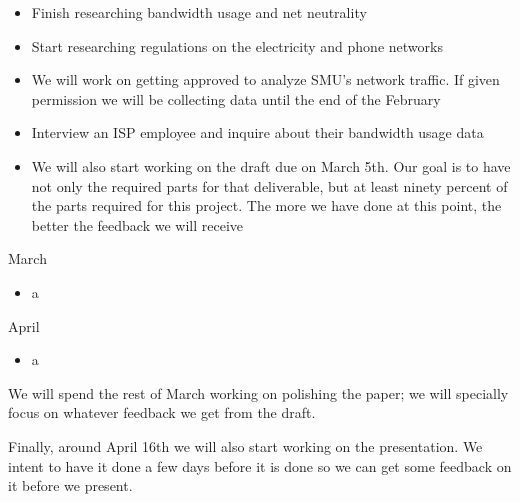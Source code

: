\documentclass{sigcomm-alternate}
\begin{document}
\begin{itemize}
	
	\item Finish researching bandwidth usage and net neutrality
	
	\item Start researching regulations on the electricity and phone networks
	
	\item We will work on getting approved to analyze SMU's network traffic. If given permission we will be collecting data until the end of the February
		
	\item Interview an ISP employee and inquire about their bandwidth usage data
		
	\item We will also start working on the draft due on March 5th. Our goal is to have not only the required parts for that deliverable, but at least ninety percent of the parts required for this project. The more we have done at this point, the better the feedback we will receive%
		
\end{itemize}



March
\begin{itemize}
	\item a
\end{itemize}

April
\begin{itemize}
		\item a
\end{itemize}


		

	

	We will spend the rest of March working on polishing the paper; we will specially focus on whatever feedback we get from the draft. 
	
	Finally, around April 16th we will also start working on the presentation. We intent to have it done a few days before it is done so we can get some feedback on it before we present.  
\end{document}
